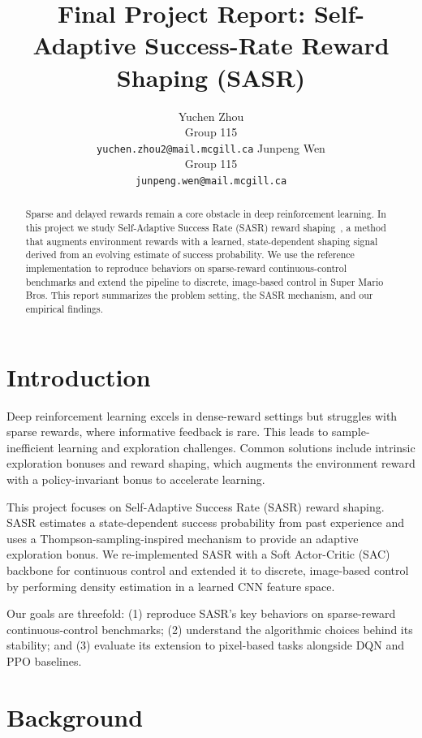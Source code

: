 \documentclass{article}
\title{Final Project Report: Self-Adaptive Success-Rate Reward Shaping (SASR)}
\author{
Yuchen Zhou \\
Group 115 \\
\texttt{yuchen.zhou2@mail.mcgill.ca}
\And
Junpeng Wen \\
Group 115 \\
\texttt{junpeng.wen@mail.mcgill.ca}
}
\begin{document}
\maketitle

\begin{abstract}
Sparse and delayed rewards remain a core obstacle in deep reinforcement learning. In this project we study Self-Adaptive Success Rate (SASR) reward shaping~\citep{ma2025sasr}, a method that augments environment rewards with a learned, state-dependent shaping signal derived from an evolving estimate of success probability. We use the reference implementation to reproduce behaviors on sparse-reward continuous-control benchmarks and extend the pipeline to discrete, image-based control in Super Mario Bros. This report summarizes the problem setting, the SASR mechanism, and our empirical findings.
\end{abstract}

\section{Introduction}
\label{sec:introduction}

Deep reinforcement learning excels in dense-reward settings but struggles with sparse rewards, where informative feedback is rare. This leads to sample-inefficient learning and exploration challenges. Common solutions include intrinsic exploration bonuses and reward shaping, which augments the environment reward with a policy-invariant bonus to accelerate learning.

This project focuses on Self-Adaptive Success Rate (SASR) reward shaping. SASR estimates a state-dependent success probability from past experience and uses a Thompson-sampling-inspired mechanism to provide an adaptive exploration bonus. We re-implemented SASR with a Soft Actor-Critic (SAC) backbone for continuous control and extended it to discrete, image-based control by performing density estimation in a learned CNN feature space.

Our goals are threefold: (1) reproduce SASR's key behaviors on sparse-reward continuous-control benchmarks; (2) understand the algorithmic choices behind its stability; and (3) evaluate its extension to pixel-based tasks alongside DQN and PPO baselines.

\section{Background}
\label{sec:background}
\end{document}
